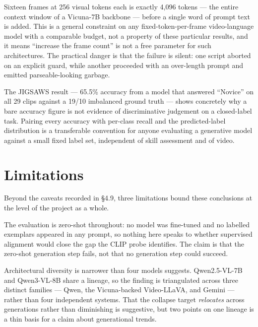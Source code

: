  Sixteen frames at 256
visual tokens each is exactly 4{,}096 tokens --- the entire context window
of a Vicuna-7B backbone --- before a single word of prompt text is added.
This is a general constraint on any fixed-token-per-frame video-language
model with a comparable budget, not a property of these particular results,
and it means ``increase the frame count'' is not a free parameter for such
architectures. The practical danger is that the failure is silent: one
script aborted on an explicit guard, while another proceeded with an
over-length prompt and emitted parseable-looking garbage.

 The JIGSAWS result ---
65.5\% accuracy from a model that answered ``Novice'' on all 29 clips
against a 19/10 imbalanced ground truth --- shows concretely why a bare
accuracy figure is not evidence of discriminative judgement on a
closed-label task. Pairing every accuracy with per-class recall and the
predicted-label distribution is a transferable convention for anyone
evaluating a generative model against a small fixed label set, independent
of skill assessment and of video.

\section{Limitations}

Beyond the caveats recorded in §4.9, three limitations bound these
conclusions at the level of the project as a whole.

The evaluation is zero-shot throughout: no model was fine-tuned and no
labelled exemplars appeared in any prompt, so nothing here speaks to whether
supervised alignment would close the gap the CLIP probe identifies. The
claim is that the zero-shot generation step fails, not that no generation
step could succeed.

Architectural diversity is narrower than four models suggests. Qwen2.5-VL-7B
and Qwen3-VL-8B share a lineage, so the finding is triangulated across three
distinct families --- Qwen, the Vicuna-backed Video-LLaVA, and Gemini ---
rather than four independent systems. That the collapse target
\emph{relocates} across generations rather than diminishing is suggestive,
but two points on one lineage is a thin basis for a claim about generational
trends.

